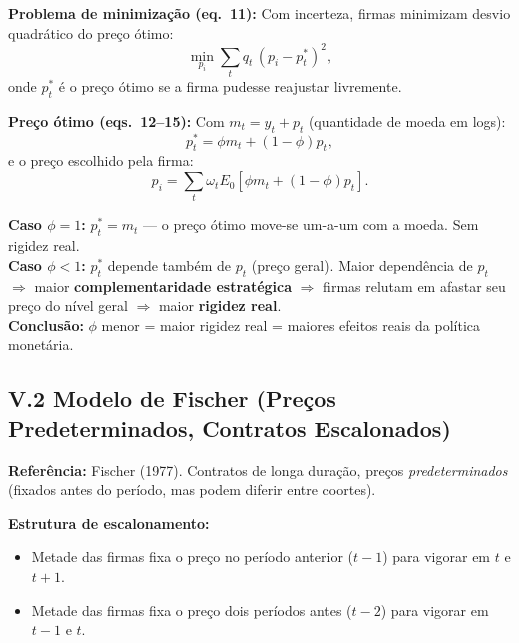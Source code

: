 \documentclass[12pt, a4paper]{article}
\begin{document}
\textbf{Problema de minimização (eq.\ 11):} Com incerteza, firmas minimizam desvio quadrático do preço ótimo:
\begin{equation}
\min_{p_i} \sum_t q_t\,(p_i - p_t^*)^2, \tag{eq.\ 11}
\end{equation}
onde $p_t^*$ é o preço ótimo se a firma pudesse reajustar livremente.

\textbf{Preço ótimo (eqs.\ 12--15):} Com $m_t = y_t + p_t$ (quantidade de moeda em logs):
\begin{equation}
p_t^* = \phi m_t + (1-\phi)p_t, \tag{eq.\ 14}
\end{equation}
e o preço escolhido pela firma:
\begin{equation}
p_i = \sum_t \omega_t E_0[\phi m_t + (1-\phi)p_t]. \tag{eq.\ 15}
\end{equation}

\begin{resultbox}[title={Intuição de $\phi$ como Rigidez Real}]
\textbf{Caso $\phi=1$:} $p_t^* = m_t$ --- o preço ótimo move-se um-a-um com a moeda. Sem rigidez real.\\
\textbf{Caso $\phi<1$:} $p_t^*$ depende também de $p_t$ (preço geral). Maior dependência de $p_t$ $\Rightarrow$ maior \textbf{complementaridade estratégica} $\Rightarrow$ firmas relutam em afastar seu preço do nível geral $\Rightarrow$ maior \textbf{rigidez real}.\\
\textbf{Conclusão:} $\phi$ menor = maior rigidez real = maiores efeitos reais da política monetária.
\end{resultbox}

\subsection*{V.2 Modelo de Fischer (Preços Predeterminados, Contratos Escalonados)}

\textbf{Referência:} Fischer (1977). Contratos de longa duração, preços \emph{predeterminados} (fixados antes do período, mas podem diferir entre coortes).

\textbf{Estrutura de escalonamento:}
\begin{itemize}[leftmargin=1.5em, itemsep=2pt]
  \item Metade das firmas fixa o preço no período anterior ($t-1$) para vigorar em $t$ e $t+1$.
  \item Metade das firmas fixa o preço dois períodos antes ($t-2$) para vigorar em $t-1$ e $t$.
\end{itemize}
\end{document}
